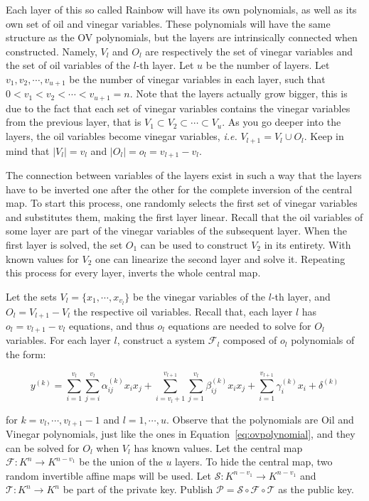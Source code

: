 \documentclass{ufsctex/ufsctex}
\begin{document}
Each layer of this so called Rainbow will have its own polynomials, as well as
its own set of oil and vinegar variables. These polynomials will have the same
structure as the OV polynomials, but the layers are intrinsically connected
when constructed. Namely, $V_l$ and $O_l$ are respectively the set of vinegar
variables and the set of oil variables of the $l$-th layer. Let $u$ be the
number of layers. Let $v_1, v_2, \cdots, v_{u+1}$ be the number of vinegar
variables in each layer, such that $0 < v_1 < v_2 < \cdots < v_{u+1} = n$. Note
that the layers actually grow bigger, this is due to the fact that each set of
vinegar variables contains the vinegar variables from the previous layer, that
is $V_1 \subset V_2 \subset \cdots \subset V_{u}$. As you go deeper into the
layers, the oil variables become vinegar variables, \textit{i.e.} $V_{l+1} =
V_l \cup O_l$. Keep in mind that $|V_l| = v_l$ and $|O_l| = o_l = v_{l+1} -
v_{l}$.

The connection between variables of the layers exist in such a way that the
layers have to be inverted one after the other for the complete inversion of
the central map. To start this process, one randomly selects the first set of
vinegar variables and substitutes them, making the first layer linear. Recall
that the oil variables of some layer are part of the vinegar variables of the
subsequent layer. When the first layer is solved, the set $O_1$ can be used to
construct $V_2$ in its entirety. With known values for $V_2$ one can linearize
the second layer and solve it. Repeating this process for every layer, inverts
the whole central map.

Let the sets $V_l = \{x_1, \cdots, x_{v_l}\}$ be the vinegar variables of the
$l$-th layer, and $O_l = V_{l+1} - V_l$ the respective oil variables. Recall
that, each layer $l$ has $o_l = v_{l+1} - v_{l}$ equations, and thus $o_l$
equations are needed to solve for $O_l$ variables. For each layer $l$,
construct a system $\mathcal{F}_l$ composed of $o_l$ polynomials of the form:

\begin{equation}
y^{(k)} =
\sum_{i=1}^{v_l}\sum_{j=i}^{v_l} \alpha^{(k)}_{ij} x_i x_j +
\sum_{i=v_l+1}^{v_{l+1}}\sum_{j=1}^{v_l} \beta^{(k)}_{ij} x_i x_j +
\sum_{i=1}^{v_{l+1}} \gamma^{(k)}_{i} x_i +
\delta^{(k)}
\end{equation}

for $k = v_l, \cdots, v_{l+1} - 1$ and $l = 1, \cdots, u$. Observe that the
polynomials are Oil and Vinegar polynomials, just like the ones in
Equation~\ref{eq:ovpolynomial}, and they can be solved for $O_l$ when $V_l$ has
known values. Let the central map $\mathcal{F}:K^{n} \to K^{n-v_1}$ be the
union of the $u$ layers. To hide the central map, two random invertible affine
maps will be used. Let $\mathcal{S}:K^{n-v_1} \to K^{n-v_1}$ and
$\mathcal{T}:K^{n} \to K^{n}$ be part of the private key. Publish $\mathcal{P}
= \mathcal{S} \circ \mathcal{F} \circ \mathcal{T}$ as the public key.
\end{document}
